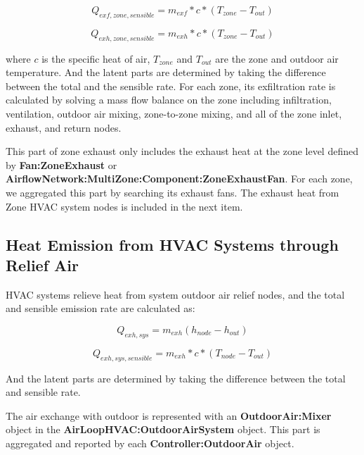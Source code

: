 \begin{equation}  \label{eq:he-4}
Q_{exf, zone, sensible} = m_{exf} * c * (T_{zone} - T_{out})
\end{equation}

\begin{equation}  \label{eq:he-5}
Q_{exh, zone, sensible} = m_{exh} * c * (T_{zone} - T_{out})
\end{equation}

where \(c\) is the specific heat of air, \(T_{zone}\) and \(T_{out}\) are the zone and outdoor air temperature. And the latent parts are determined by taking the difference between the total and the sensible rate. For each zone, its exfiltration rate is calculated by solving a mass flow balance on the zone including infiltration, ventilation, outdoor air mixing, zone-to-zone mixing, and all of the zone inlet, exhaust, and return nodes.

This part of zone exhaust only includes the exhaust heat at the zone level defined by \textbf{Fan:ZoneExhaust} or \textbf{AirflowNetwork:MultiZone:Component:ZoneExhaustFan}. For each zone, we aggregated this part by searching its exhaust fans. The exhaust heat from Zone HVAC system nodes is included in the next item.

\subsection{Heat Emission from HVAC Systems through Relief Air}\label{emission-from-HVAC-relief}

HVAC systems relieve heat from system outdoor air relief nodes, and the total and sensible emission rate are calculated as:

\begin{equation}  \label{eq:he-6}
Q_{exh, sys} = m_{exh}(h_{node} - h_{out})
\end{equation}

\begin{equation}  \label{eq:he-7}
Q_{exh, sys, sensible} = m_{exh} * c * (T_{node} - T_{out})
\end{equation}

And the latent parts are determined by taking the difference between the total and sensible rate.

The air exchange with outdoor is represented with an \textbf{OutdoorAir:Mixer} object in the \textbf{AirLoopHVAC:OutdoorAirSystem} object. This part is aggregated and reported by each \textbf{Controller:OutdoorAir} object.

